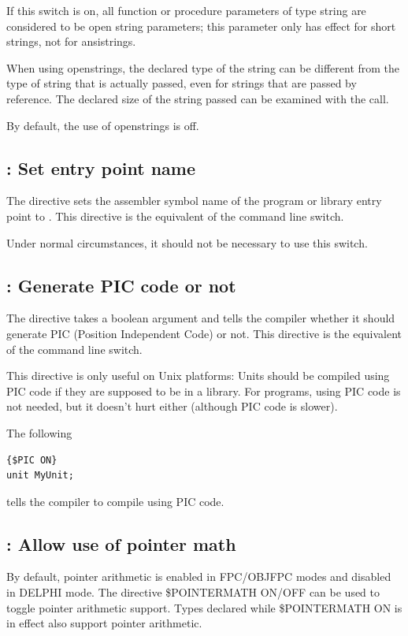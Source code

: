 If this switch is on, all function or procedure parameters of type string
are considered to be open string parameters; this parameter only has effect
for short strings, not for ansistrings.

When using openstrings, the declared type of the string can be different
from the type of string that is actually passed, even for strings that are
passed by reference. The declared size of the string passed can be examined
with the  call.

By default, the use of openstrings is off.

\subsection{ : Set entry point name}
\label{se:Pascalmainname}
The  directive sets the assembler
symbol name of the program or library entry point to .
This directive is the equivalent of the  command line switch.

Under normal circumstances, it should not be necessary to use this
switch.

\subsection{ : Generate PIC code or not}
\label{se:Pic}
The  directive takes a boolean argument and tells the
compiler whether it should generate PIC (Position Independent Code) or not.
This directive is the equivalent of the  command line switch.


This directive is only useful on Unix platforms: Units should be compiled 
using PIC code if they are supposed to be in a library. For programs, using
PIC code is not needed, but it doesn't hurt either (although PIC code is
slower).

The following 
\begin{verbatim}
{$PIC ON}
unit MyUnit;
\end{verbatim}
tells the compiler to compile  using PIC code.

\subsection{ : Allow use of pointer math}

By default, pointer arithmetic is enabled in FPC/OBJFPC modes and disabled in DELPHI mode. 
The directive {\$POINTERMATH ON/OFF} can be used to toggle pointer arithmetic support. 
Types declared while {\$POINTERMATH ON} is in effect also support pointer arithmetic. 

